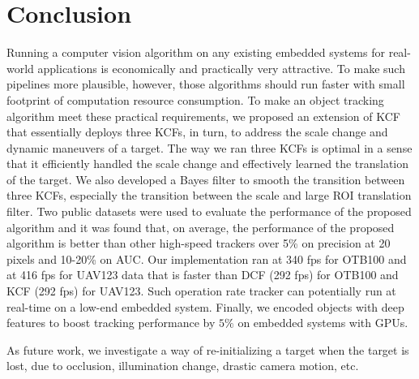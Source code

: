 \documentclass[10pt,twocolumn,letterpaper]{article}
\begin{document}
\section{Conclusion} \label{sc:Conclusion}
Running a computer vision algorithm on any existing embedded systems
for real-world applications is economically and practically very
attractive. To make such pipelines more plausible, however, those
algorithms should run faster with small footprint of computation
resource consumption. To make an object tracking algorithm meet these
practical requirements, we proposed an extension of KCF that
essentially deploys three KCFs, in turn, to address the scale change
and dynamic maneuvers of a target. The way we ran three KCFs is
optimal in a sense that it efficiently handled the scale change and
effectively learned the translation of the target. We also developed a
Bayes filter to smooth the transition between three
KCFs, especially the transition between the scale and large ROI translation filter. 
Two public datasets were used to evaluate the performance of the
proposed algorithm and it was found that, on average, the performance of the
proposed algorithm is better than other high-speed trackers over 5\%
on precision at 20 pixels and 10-20\% on AUC. Our
implementation ran at 340 fps for OTB100 and at 416 fps for UAV123
data that is faster than DCF (292 fps) for OTB100 and KCF (292 fps) 
for UAV123. Such operation rate tracker can potentially run at real-time
on a low-end embedded system. Finally, we encoded objects with deep
features to boost tracking performance by $5\%$ on embedded systems
with GPUs.

As future work, we investigate a way of re-initializing a target when
the target is lost, due to occlusion, illumination change, drastic
camera motion, etc.

{\small


}
\end{document}
